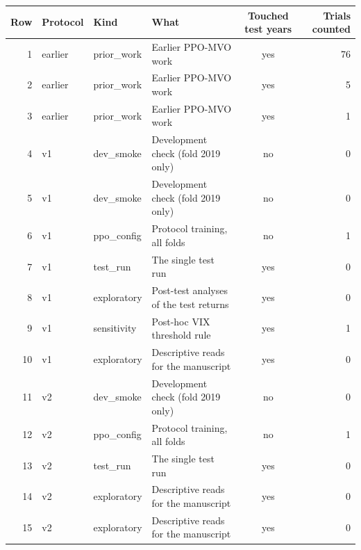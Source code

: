\begin{tabular}{rlllcr}
\toprule
Row & Protocol & Kind & What & Touched test years & Trials counted \\
\midrule
1 & earlier & prior\_work & Earlier PPO-MVO work & yes & 76 \\
2 & earlier & prior\_work & Earlier PPO-MVO work & yes & 5 \\
3 & earlier & prior\_work & Earlier PPO-MVO work & yes & 1 \\
4 & v1 & dev\_smoke & Development check (fold 2019 only) & no & 0 \\
5 & v1 & dev\_smoke & Development check (fold 2019 only) & no & 0 \\
6 & v1 & ppo\_config & Protocol training, all folds & no & 1 \\
7 & v1 & test\_run & The single test run & yes & 0 \\
8 & v1 & exploratory & Post-test analyses of the test returns & yes & 0 \\
9 & v1 & sensitivity & Post-hoc VIX threshold rule & yes & 1 \\
10 & v1 & exploratory & Descriptive reads for the manuscript & yes & 0 \\
11 & v2 & dev\_smoke & Development check (fold 2019 only) & no & 0 \\
12 & v2 & ppo\_config & Protocol training, all folds & no & 1 \\
13 & v2 & test\_run & The single test run & yes & 0 \\
14 & v2 & exploratory & Descriptive reads for the manuscript & yes & 0 \\
15 & v2 & exploratory & Descriptive reads for the manuscript & yes & 0 \\
\bottomrule
\end{tabular}
